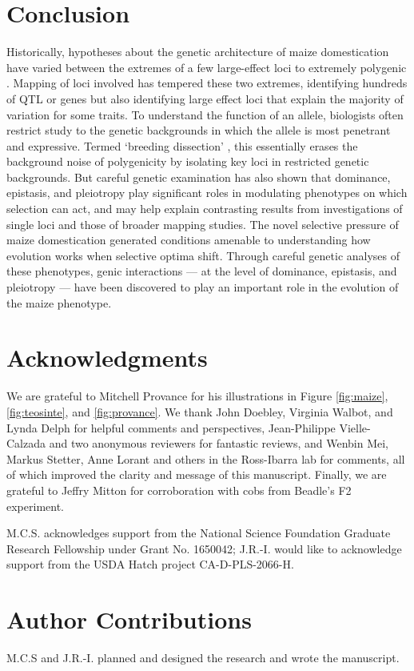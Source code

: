 \documentclass[9pt,twocolumn,twoside]{rilabRxiv}
\begin{document}
\section*{Conclusion}

Historically, hypotheses about the genetic architecture of maize domestication have varied between the extremes of a few large-effect loci \citep{beadle1939, mangelsdorf1939} to extremely polygenic \citep{iltis1983}.
Mapping of loci involved has tempered these two extremes, identifying hundreds of QTL \citep{briggs2007} or genes \citep{wright2005, hufford2012natgen} but also identifying large effect loci that explain the majority of variation for some traits.
To understand the function of an allele,  biologists often restrict study to the genetic backgrounds in which the allele is most penetrant and expressive.
Termed `breeding dissection' \citep{wilkes2004}, this essentially erases the background noise of polygenicity by isolating key loci in restricted genetic backgrounds.
But careful genetic examination has also shown that dominance, epistasis, and pleiotropy play significant roles in modulating phenotypes on which selection can act, and may help explain contrasting results from investigations of single loci and those of broader mapping studies.
The novel selective pressure of maize domestication generated conditions amenable to understanding how evolution works when selective optima shift.
Through careful genetic analyses of these phenotypes, genic interactions --- at the level of dominance, epistasis, and pleiotropy --- have been discovered to play an important role in the evolution of the maize phenotype.


 \section*{Acknowledgments}
We are grateful to Mitchell Provance for his illustrations in Figure \ref{fig:maize}, \ref{fig:teosinte}, and \ref{fig:provance}.
We thank John Doebley, Virginia Walbot, and Lynda Delph for helpful comments and perspectives, Jean-Philippe Vielle-Calzada and two anonymous reviewers for fantastic reviews, and Wenbin Mei, Markus Stetter, Anne Lorant and others in the Ross-Ibarra lab for comments, all of which improved the clarity and message of this manuscript.
Finally, we are grateful to Jeffry Mitton for corroboration with cobs from Beadle's F2 experiment.

M.C.S. acknowledges support from the National Science Foundation Graduate Research Fellowship under Grant No. 1650042; J.R.-I. would like to acknowledge support from the USDA Hatch project CA-D-PLS-2066-H.

\section*{Author Contributions}
M.C.S and J.R.-I. planned and designed the research and wrote the manuscript.

 
 
\end{document}
